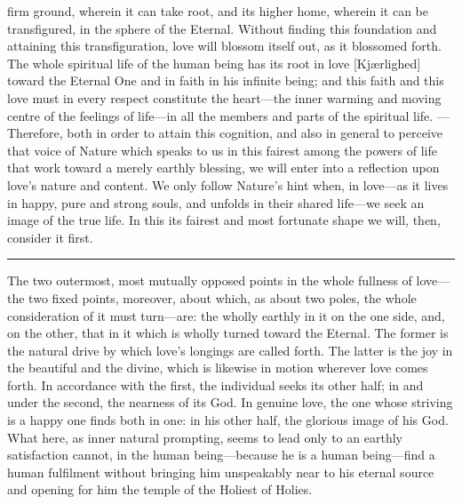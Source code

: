 \documentclass[12pt,a4paper]{book}
\begin{document}
firm ground, wherein it can take root, and its higher home, wherein it can
be transfigured, in the sphere of the Eternal. Without finding this
foundation and attaining this transfiguration, love will blossom itself
out, as it blossomed forth. The whole spiritual life of the human being
has its root in love [Kjærlighed] toward the Eternal One and in faith in
his infinite being; and this faith and this love must in every respect
constitute the heart---the inner warming and moving centre of the feelings
of life---in all the members and parts of the spiritual life. --- Therefore,
both in order to attain this cognition, and also in general to perceive
that voice of Nature which speaks to us in this fairest among the powers
of life that work toward a merely earthly blessing, we will enter into a
reflection upon love's nature and content. We only follow Nature's hint
when, in love---as it lives in happy, pure and strong souls, and unfolds
in their shared life---we seek an image of the true life. In this its
fairest and most fortunate shape we will, then, consider it first.

\begin{center}\rule{0.2\linewidth}{0.4pt}\end{center}

The two outermost, most mutually opposed points in the whole fullness of
love---the two fixed points, moreover, about which, as about two poles,
the whole consideration of it must turn---are: the wholly earthly in it
on the one side, and, on the other, that in it which is wholly turned
toward the Eternal. The former is the natural drive by which love's
longings are called forth. The latter is the joy in the beautiful and the
divine, which is likewise in motion wherever love comes forth. In
accordance with the first, the individual seeks its other half; in and
under the second, the nearness of its God. In genuine love, the one whose
striving is a happy one finds both in one: in his other half, the glorious
image of his God. What here, as inner natural prompting, seems to lead
only to an earthly satisfaction cannot, in the human being---because he is
a human being---find a human fulfilment without bringing him unspeakably
near to his eternal source and opening for him the temple of the Holiest
of Holies.
\end{document}
